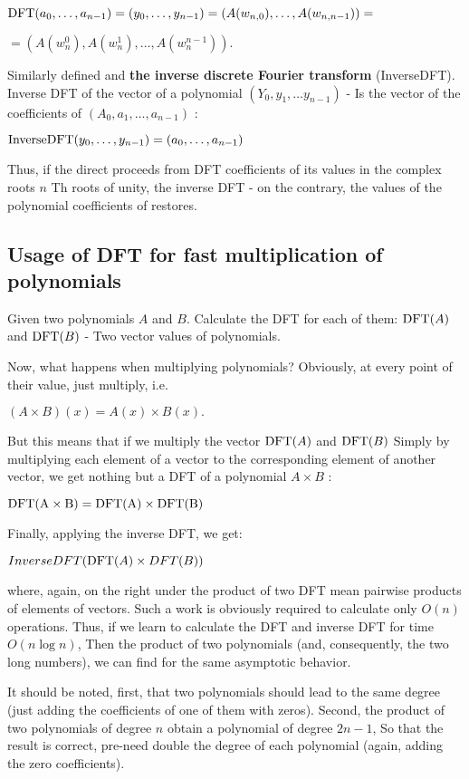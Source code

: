 ${\rm DFT}(a_{0},\ldots,a_{n-1})=(y_{0},\ldots,y_{n-1})=(A(w_{n,0}),\ldots,A(w_{n,n-1}))=$

$= (A (w_n ^ 0), A (w_n ^ 1), \ldots, A (w_n ^ {n-1})).$

Similarly defined and \textbf{the inverse discrete Fourier transform} (InverseDFT). Inverse DFT of the vector of a polynomial $(Y_0, y_1, \ldots y_ {n-1})$ - Is the vector of the coefficients of $(A_0, a_1, \ldots, a_ {n-1})$ :

${\rm InverseDFT}(y_{0},\ldots,y_{n-1})=(a_{0},\ldots,a_{n-1})$

Thus, if the direct proceeds from DFT coefficients of its values ​​in the complex roots $n$ Th roots of unity, the inverse DFT - on the contrary, the values ​​of the polynomial coefficients of restores.

\subsection{ Usage of DFT for fast multiplication of polynomials }

Given two polynomials $A$ and $B$. Calculate the DFT for each of them: ${\rm DFT} (A)$ and ${\rm DFT} (B)$ - Two vector values ​​of polynomials.

Now, what happens when multiplying polynomials? Obviously, at every point of their value, just multiply, i.e.

$(A \times B) (x) = A (x) \times B (x).$

But this means that if we multiply the vector ${\rm DFT} (A)$ and ${\rm DFT} (B)$ Simply by multiplying each element of a vector to the corresponding element of another vector, we get nothing but a DFT of a polynomial $A \times B$ :

${\rm DFT(A\times B)={\rm DFT(A)\times DFT(B)}}$

Finally, applying the inverse DFT, we get:

$InverseDFT({\rm DFT}(A)\times DFT(B))$

where, again, on the right under the product of two DFT mean pairwise products of elements of vectors. Such a work is obviously required to calculate only $O (n)$ operations. Thus, if we learn to calculate the DFT and inverse DFT for time $O (n \log n)$, Then the product of two polynomials (and, consequently, the two long numbers), we can find for the same asymptotic behavior.

It should be noted, first, that two polynomials should lead to the same degree (just adding the coefficients of one of them with zeros). Second, the product of two polynomials of degree $n$ obtain a polynomial of degree $2n-1$, So that the result is correct, pre-need double the degree of each polynomial (again, adding the zero coefficients).

